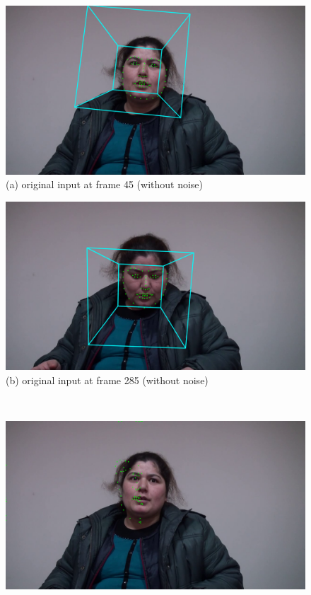 \begin{figure}[htb]
    \centering
    \small
    \begin{minipage}[c]{0.42\linewidth}
    \centering
    \includegraphics[width=\textwidth]{images/facial/frame_45_face_0.png} \\
    (a) original input at frame 45 (without noise)
    \end{minipage}
    \begin{minipage}[c]{0.42\linewidth}
    \centering
    \includegraphics[width=\textwidth]{images/facial/frame_285_face_0.png} \\
    (b) original input at frame 285 (without noise)
    \end{minipage}
    \\
    \begin{minipage}[c]{0.42\linewidth}
    \centering
    \includegraphics[width=\textwidth]{images/facial/recons_45_face_0_biDDAE_mfcc.png} \\

\end{minipage}
\end{figure}
